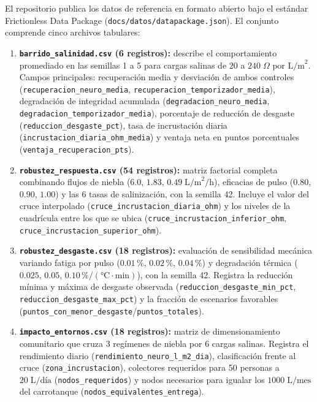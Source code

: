 El repositorio publica los datos de referencia en formato abierto bajo el est\'andar Frictionless Data Package (\texttt{docs/datos/datapackage.json}). El conjunto comprende cinco archivos tabulares:
\begin{enumerate}[leftmargin=*]
  \item \textbf{\texttt{barrido\_salinidad.csv} (6 registros):} describe el comportamiento promediado en las semillas 1 a 5 para cargas salinas de 20 a $240\;\Omega\text{ por L/m}^2$. Campos principales: recuperaci\'on media y desviaci\'on de ambos controles (\texttt{recuperacion\_\allowbreak neuro\_\allowbreak media}, \texttt{recuperacion\_\allowbreak temporizador\_\allowbreak media}), degradaci\'on de integridad acumulada (\texttt{degradacion\_\allowbreak neuro\_\allowbreak media}, \texttt{degradacion\_\allowbreak temporizador\_\allowbreak media}), porcentaje de reducci\'on de desgaste (\texttt{reduccion\_\allowbreak desgaste\_\allowbreak pct}), tasa de incrustaci\'on diaria (\texttt{incrustacion\_\allowbreak diaria\_\allowbreak ohm\_\allowbreak media}) y ventaja neta en puntos porcentuales (\texttt{ventaja\_\allowbreak recuperacion\_\allowbreak pts}).
  \item \textbf{\texttt{robustez\_respuesta.csv} (54 registros):} matriz factorial completa combinando flujos de niebla ($6.0$, $1.83$, $0.49\;\text{L/m}^2\text{/h}$), eficacias de pulso ($0.80$, $0.90$, $1.00$) y las 6 tasas de salinizaci\'on, con la semilla 42. Incluye el valor del cruce interpolado (\texttt{cruce\_\allowbreak incrustacion\_\allowbreak diaria\_ohm}) y los niveles de la cuadr\'icula entre los que se ubica (\texttt{cruce\_\allowbreak incrustacion\_\allowbreak inferior\_ohm}, \texttt{cruce\_\allowbreak incrustacion\_\allowbreak superior\_ohm}).
  \item \textbf{\texttt{robustez\_desgaste.csv} (18 registros):} evaluaci\'on de sensibilidad mec\'anica variando fatiga por pulso ($0.01\,\%$, $0.02\,\%$, $0.04\,\%$) y degradaci\'on t\'ermica ($0.025$, $0.05$, $0.10\,\%/(\si{\celsius}\cdot\text{min})$), con la semilla 42. Registra la reducci\'on m\'inima y m\'axima de desgaste observada (\texttt{reduccion\_\allowbreak desgaste\_min\_pct}, \texttt{reduccion\_\allowbreak desgaste\_max\_pct}) y la fracci\'on de escenarios favorables (\texttt{puntos\_\allowbreak con\_menor\_desgaste}/\texttt{puntos\_totales}).
  \item \textbf{\texttt{impacto\_entornos.csv} (18 registros):} matriz de dimensionamiento comunitario que cruza 3 reg\'imenes de niebla por 6 cargas salinas. Registra el rendimiento diario (\texttt{rendimiento\_\allowbreak neuro\_l\_m2\_dia}), clasificaci\'on frente al cruce (\texttt{zona\_\allowbreak incrustacion}), colectores requeridos para 50 personas a $20\;\text{L/d\'ia}$ (\texttt{nodos\_requeridos}) y nodos necesarios para igualar los $1000\;\text{L/mes}$ del carrotanque (\texttt{nodos\_\allowbreak equivalentes\_entrega}).

\end{enumerate}
